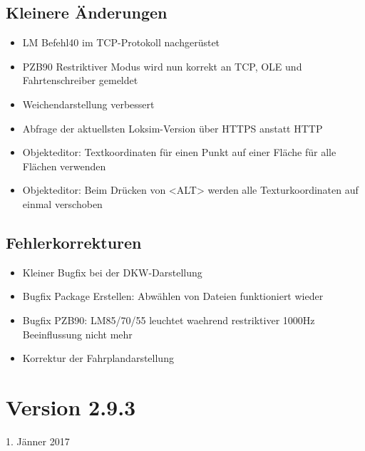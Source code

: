 \subsection{Kleinere Änderungen}
\begin{itemize}
\item LM Befehl40 im TCP-Protokoll nachgerüstet
\item PZB90 Restriktiver Modus wird nun korrekt an TCP, OLE und Fahrtenschreiber gemeldet
\item Weichendarstellung verbessert
\item Abfrage der aktuellsten Loksim-Version über HTTPS anstatt HTTP
\item Objekteditor: Textkoordinaten für einen Punkt auf einer Fläche für alle Flächen verwenden
\item Objekteditor: Beim Drücken von <ALT> werden alle Texturkoordinaten auf einmal verschoben
\end{itemize}


\subsection{Fehlerkorrekturen}
\begin{itemize}
\item Kleiner Bugfix bei der DKW-Darstellung
\item Bugfix Package Erstellen: Abwählen von Dateien funktioniert wieder
\item Bugfix PZB90: LM85/70/55 leuchtet waehrend restriktiver 1000Hz Beeinflussung nicht mehr
\item Korrektur der Fahrplandarstellung
\end{itemize}


\section{Version 2.9.3}\hfill 1. Jänner 2017
